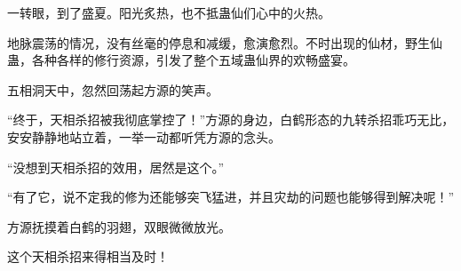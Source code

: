 \begin{this_body}
一转眼，到了盛夏。阳光炙热，也不抵蛊仙们心中的火热。

地脉震荡的情况，没有丝毫的停息和减缓，愈演愈烈。不时出现的仙材，野生仙蛊，各种各样的修行资源，引发了整个五域蛊仙界的欢畅盛宴。

五相洞天中，忽然回荡起方源的笑声。

“终于，天相杀招被我彻底掌控了！”方源的身边，白鹤形态的九转杀招乖巧无比，安安静静地站立着，一举一动都听凭方源的念头。

“没想到天相杀招的效用，居然是这个。”

“有了它，说不定我的修为还能够突飞猛进，并且灾劫的问题也能够得到解决呢！”

方源抚摸着白鹤的羽翅，双眼微微放光。

这个天相杀招来得相当及时！

\end{this_body}

